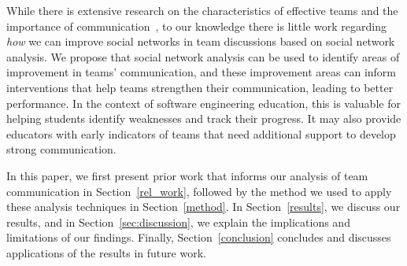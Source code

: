 While there is extensive research on the characteristics of effective teams and the importance of communication~\cite{mathieuTeamEffectiveness199720072008}, to our knowledge there is little work regarding \textit{how} we can improve social networks in team discussions based on social network analysis. We propose that social network analysis can be used to identify areas of improvement in teams' communication, and these improvement areas can inform interventions that help teams strengthen their communication, leading to better performance. In the context of software engineering education, this is valuable for helping students identify weaknesses and track their progress. It may also provide educators with early indicators of teams that need additional support to develop strong communication.  




In this paper, we first present prior work that informs our analysis of team communication in Section~\ref{rel_work}, followed by the method we used to apply these analysis techniques in Section~\ref{method}. In Section~\ref{results}, we discuss our results, and in Section~\ref{sec:discussion}, we explain the implications and limitations of our findings. Finally, Section~\ref{conclusion} concludes and discusses applications of the results in future work.